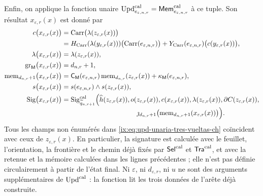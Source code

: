 Enfin, on applique la fonction unaire
\(\operatorname{Upd}^{\rm cal}_{e_{\varepsilon,n,r}}
=\mathsf{Mem}^{\rm cal}_{e_{\varepsilon,n,r}}\) à ce tuple. Son
résultat \(x_{\varepsilon,r}(x)\) est donné par
\begin{equation}
\begin{aligned}
 c\bigl(x_{\varepsilon,r}(x)\bigr)
   &=\operatorname{Carr}\bigl(\lambda(z_{\varepsilon,r}(x))\bigr)\\
   &=H_{\rm Carr}(\lambda(y_{\varepsilon,r}(x)))
       \bigl(\operatorname{Carr}(e_{\varepsilon,n,r})\bigr)
     +Y_{\rm Carr}(e_{\varepsilon,n,r})
       \bigl(c(y_{\varepsilon,r}(x))\bigr),\\
 \lambda\bigl(x_{\varepsilon,r}(x)\bigr)
   &=\lambda(z_{\varepsilon,r}(x)),\\
 \operatorname{gr}_{\mathsf M}
      \bigl(x_{\varepsilon,r}(x)\bigr)
   &=d_{n,r}+1,\\
 \operatorname{mem}_{d_{n,r}+1}
       \bigl(x_{\varepsilon,r}(x)\bigr)
   &=\mathsf C_{\mathsf M}(e_{\varepsilon,n,r})
       \operatorname{mem}_{d_{n,r}}(z_{\varepsilon,r}(x))
     +\kappa_{\mathsf M}(e_{\varepsilon,n,r}),\\
 s\bigl(x_{\varepsilon,r}(x)\bigr)
   &=s(e_{\varepsilon,n,r})\wedge s(z_{\varepsilon,r}(x)),\\
 \operatorname{Sig}\bigl(x_{\varepsilon,r}(x)\bigr)
   &=\operatorname{Sig}^{\rm cal}_{\widetilde q_{n,r+1}}
       \Bigl(\widehat h(z_{\varepsilon,r}(x)),
             o(z_{\varepsilon,r}(x)),
             c(x_{\varepsilon,r}(x)),
             \lambda(z_{\varepsilon,r}(x)),
             \partial C(z_{\varepsilon,r}(x)),\\[-2pt]
   &\hspace{112pt}
             \jmath_{d_{n,r}+1}
              \bigl(\operatorname{mem}_{d_{n,r}+1}
                 (x_{\varepsilon,r}(x))\bigr)\Bigr).
\end{aligned}
\label{ix:eq:upd-unaria-tres-vueltas-ch}
\end{equation}
Tous les champs non énumérés dans \eqref{ix:eq:upd-unaria-tres-vueltas-ch} coïncident avec ceux de \(z_{\varepsilon,r}(x)\). En particulier, la signature est calculée avec le feuillet, l'orientation, la frontière et le chemin déjà fixés par \(\mathsf{Sel}^{\rm cal}\) et \(\mathsf{Tra}^{\rm cal}\), et avec la retenue et la mémoire calculées dans les lignes précédentes ; elle n'est pas définie circulairement à partir de l'état final. Ni \(\varepsilon\), ni \(d_{\varepsilon,r}\), ni \(u\) ne sont des arguments supplémentaires de \(\operatorname{Upd}^{\rm cal}\) : la fonction lit les trois données de l'arête déjà construite.

